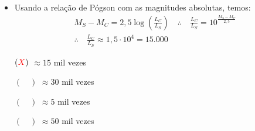 \documentclass[a4paper, 12pt]{article}
\newcommand{\red}[1]{\textcolor{red}{#1}}
\begin{document}
\begin{flushleft}
\begin{itemize}
\begin{itemize}
{\begin{itemize}
                            \item Usando a relação de Pógson com as magnitudes absolutas, temos:
                                \begin{equation*} \begin{gathered}
                                    M_S-M_C = 2,5 \log \left(\frac{L_C}{L_S}\right) \quad \therefore \quad \frac{L_C}{L_S} = 10^{\frac{M_S-M_C}{2,5}} \\
                                    \therefore \quad \frac{L_C}{L_S} \approx 1,5 \cdot 10^4 = 15.000
                                \end{gathered} \end{equation*}
                        \end{itemize}}
                        \begin{itemize}
                            \item[$(\red{X})$] $\approx 15$ mil vezes
                            \item[$(\quad)$] $\approx 30$ mil vezes
                            \item[$(\quad)$] $\approx 5$ mil vezes
                            \item[$(\quad)$] $\approx 50$ mil vezes
                        \end{itemize}
                \end{itemize}
            

\end{itemize}
\end{flushleft}
\end{document}

